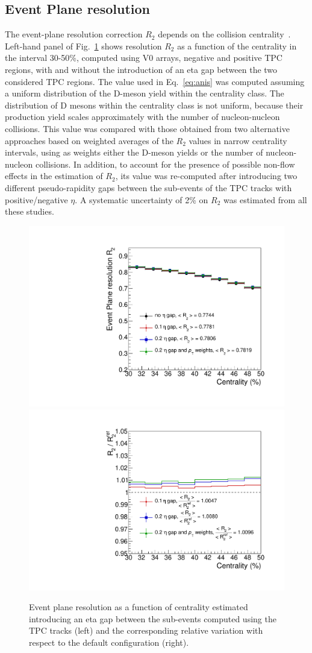\subsection{Event Plane resolution}
\label{sec:EPreso}
The event-plane resolution correction $R_2$ depends on the 
collision centrality~\cite{Abelev:2014ipa}. Left-hand panel of Fig.~\ref{fig:EtaGapSyst} shows
resolution $R_2$ as a function of the centrality in the interval
30-50\%, computed using V0 arrays, negative and positive TPC
regions, with and without the introduction of an 
eta gap between the two considered TPC regions.
The value used in Eq.~\ref{eq:anis} was computed
 assuming a uniform distribution of the D-meson yield within 
 the centrality class. The distribution of D mesons within the 
 centrality class is not uniform, because their production yield
scales approximately with the number of nucleon-nucleon collisions.
This value was compared with those obtained from two alternative approaches
based on weighted averages of the $R_2$ values in narrow centrality 
intervals, using as weights either the D-meson yields or the number of 
nucleon-nucleon collisions. 
In addition, to account for the presence of possible non-flow effects in the estimation of $R_2$, 
its value was re-computed after introducing two different pseudo-rapidity gaps between the
sub-events of the TPC tracks with positive/negative $\eta$. 
A systematic uncertainty of 2\% on $R_2$ was estimated from 
all these studies.
\begin{figure}
\centering
  \includegraphics[width=.49\textwidth]{FigCap5/EPresolution_VZERO_NonFlowSyst.pdf}
  \includegraphics[width=.49\textwidth]{FigCap5/EPresolution_VZERO_NonFlowSyst_ratio.pdf}
\caption{Event plane resolution as a function of centrality estimated introducing an eta gap between the sub-events computed using the TPC tracks (left) and the corresponding relative variation with respect to the default configuration (right).}
\label{fig:EtaGapSyst}
\end{figure}

